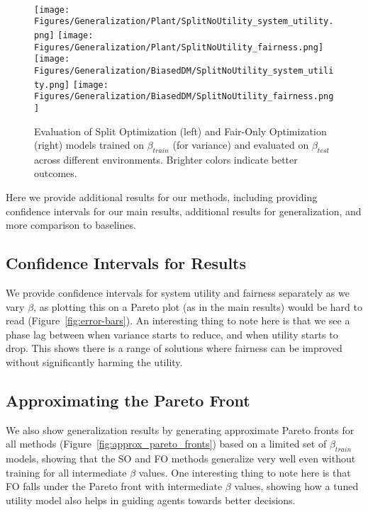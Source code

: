 \begin{figure*}[t]
{\begin{minipage}{0.48\linewidth}
            \\
            \texttt{[image: Figures/Generalization/Plant/SplitNoUtility\_system\_utility.png]}
            \texttt{[image: Figures/Generalization/Plant/SplitNoUtility\_fairness.png]}
            \\
            \texttt{[image: Figures/Generalization/BiasedDM/SplitNoUtility\_system\_utility.png]}
            \texttt{[image: Figures/Generalization/BiasedDM/SplitNoUtility\_fairness.png]}
        \end{minipage}
        \label{fig:all_results_gen_FO}
    }
    \caption{Evaluation of Split Optimization (left) and Fair-Only Optimization (right) models trained on $\beta_{train}$ (for variance) and evaluated on $\beta_{test}$ across different environments. Brighter colors indicate better outcomes.}
    \label{fig:combined_results}
\end{figure*}



Here we provide additional results for our methods, including providing confidence intervals for our main results, additional results for generalization, and more comparison to baselines. 

\subsection{Confidence Intervals for Results}
We provide confidence intervals for system utility and fairness separately as we vary $\beta$, as plotting this on a Pareto plot (as in the main results) would be hard to read (Figure~\ref{fig:error-bars}). An interesting thing to note here is that we see a phase lag between when variance starts to reduce, and when utility starts to drop. This shows there is a range of solutions where fairness can be improved without significantly harming the utility.

\subsection{Approximating the Pareto Front}
We also show generalization results by generating approximate Pareto fronts for all methods (Figure~\ref{fig:approx_pareto_fronts})   based on a limited set of $\beta_{train}$ models, showing that the SO and FO methods generalize very well even without training for all intermediate $\beta$ values. One interesting thing to note here is that FO falls under the Pareto front with intermediate $\beta$ values, showing how a tuned utility model also helps in guiding agents towards better decisions.

